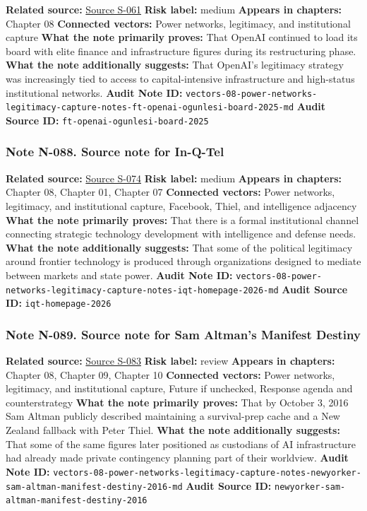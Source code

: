 \documentclass[
  american,
  11pt,
  letterpaper,
]{article}
\begin{document}
\textbf{Related source:}
\hyperref[source-s-061-openai-appoints-one-of-wall-street-s-most-powerful-dealmakers-to-its-board]{Source
S-061} \textbf{Risk label:} medium \textbf{Appears in chapters:} Chapter
08 \textbf{Connected vectors:} Power networks, legitimacy, and
institutional capture \textbf{What the note primarily proves:} That
OpenAI continued to load its board with elite finance and infrastructure
figures during its restructuring phase. \textbf{What the note
additionally suggests:} That OpenAI's legitimacy strategy was
increasingly tied to access to capital-intensive infrastructure and
high-status institutional networks. \textbf{Audit Note ID:}
\texttt{vectors-08-power-networks-legitimacy-capture-notes-ft-openai-ogunlesi-board-2025-md}
\textbf{Audit Source ID:} \texttt{ft-openai-ogunlesi-board-2025}

\subsubsection{Note N-088. Source note for
In-Q-Tel}\label{note-n-088-vectors-08-power-networks-legitimacy-capture-notes-iqt-homepage-2026-md}

\textbf{Related source:} \hyperref[source-s-074-in-q-tel]{Source S-074}
\textbf{Risk label:} medium \textbf{Appears in chapters:} Chapter 08,
Chapter 01, Chapter 07 \textbf{Connected vectors:} Power networks,
legitimacy, and institutional capture, Facebook, Thiel, and intelligence
adjacency \textbf{What the note primarily proves:} That there is a
formal institutional channel connecting strategic technology development
with intelligence and defense needs. \textbf{What the note additionally
suggests:} That some of the political legitimacy around frontier
technology is produced through organizations designed to mediate between
markets and state power. \textbf{Audit Note ID:}
\texttt{vectors-08-power-networks-legitimacy-capture-notes-iqt-homepage-2026-md}
\textbf{Audit Source ID:} \texttt{iqt-homepage-2026}

\subsubsection{Note N-089. Source note for Sam Altman's Manifest
Destiny}\label{note-n-089-vectors-08-power-networks-legitimacy-capture-notes-newyorker-sam-altman-manifest-destiny-2016-md}

\textbf{Related source:}
\hyperref[source-s-083-sam-altman-s-manifest-destiny]{Source S-083}
\textbf{Risk label:} review \textbf{Appears in chapters:} Chapter 08,
Chapter 09, Chapter 10 \textbf{Connected vectors:} Power networks,
legitimacy, and institutional capture, Future if unchecked, Response
agenda and counterstrategy \textbf{What the note primarily proves:} That
by October 3, 2016 Sam Altman publicly described maintaining a
survival-prep cache and a New Zealand fallback with Peter Thiel.
\textbf{What the note additionally suggests:} That some of the same
figures later positioned as custodians of AI infrastructure had already
made private contingency planning part of their worldview. \textbf{Audit
Note ID:}
\texttt{vectors-08-power-networks-legitimacy-capture-notes-newyorker-sam-altman-manifest-destiny-2016-md}
\textbf{Audit Source ID:}
\texttt{newyorker-sam-altman-manifest-destiny-2016}
\end{document}
